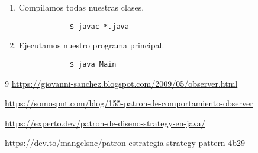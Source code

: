 \documentclass[letterpaper,11pt]{article}
\begin{document}
\begin{enumerate}
\begin{enumerate}
        \item Compilamos todas nuestras clases.
        \begin{verbatim}
            $ javac *.java
        \end{verbatim}

        \item Ejecutamos nuestro programa principal.
        \begin{verbatim}
            $ java Main 
        \end{verbatim}
    \end{enumerate}

\end{enumerate}

\begin{thebibliography} {9}
    \url{https://giovanni-sanchez.blogspot.com/2009/05/observer.html}

    \url{https://somospnt.com/blog/155-patron-de-comportamiento-observer}

    \url{https://experto.dev/patron-de-diseno-strategy-en-java/}

    \url{https://dev.to/mangelsnc/patron-estrategia-strategy-pattern-4b29}
\end{thebibliography}
\end{document}
